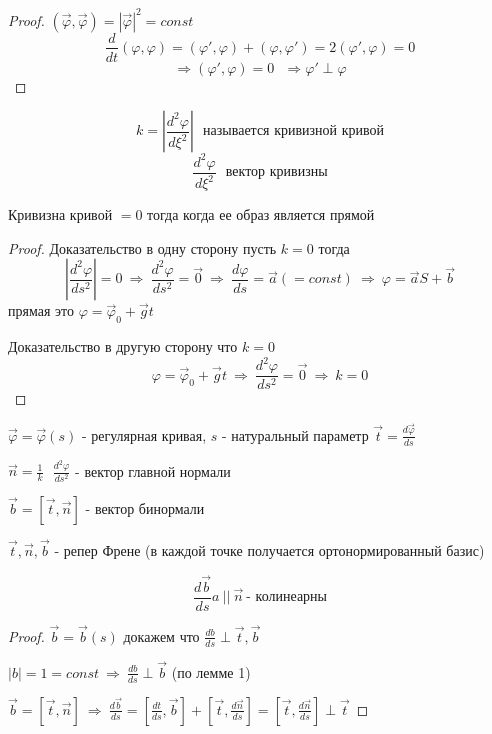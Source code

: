 \begin{proof}
  $(\vec \varphi, \vec \varphi) = |\vec \varphi|^2 = const$
  $$
  \frac{d}{dt}(\varphi, \varphi) = (\varphi', \varphi) +
  (\varphi, \varphi') = 2(\varphi', \varphi) = 0
  $$
  $$
  \Rightarrow (\varphi', \varphi) = 0 ~~~ \Rightarrow \varphi' \perp \varphi
  $$
\end{proof}

\begin{define}
  $$
  k =
  \left|
    \frac{d^2 \varphi}{d \xi^2}
  \right| ~~~
  \text{называется кривизной кривой}
  $$
  $$
    \frac{d^2 \varphi}{d \xi^2} ~~~ \text{вектор кривизны}
  $$
\end{define}

\begin{theorem}
  Кривизна кривой $= 0$ тогда когда ее образ является прямой
\end{theorem}

\begin{proof}
  Доказательство в одну сторону пусть $k = 0$ тогда
  $$
  \left| \frac{d^2 \varphi}{ds^2} \right| = 0 ~ \Rightarrow ~
  \frac{d^2 \varphi}{ds^2} = \vec 0 ~ \Rightarrow ~
  \frac{d\varphi}{d s} = \vec a (=const) ~ \Rightarrow ~
  \varphi = \vec a S + \vec b
  $$
  прямая это $\varphi = \vec \varphi_0 + \vec g t$

  Доказательство в другую сторону что $k = 0$
  $$
  \varphi = \vec \varphi_0 + \vec g t ~ \Rightarrow ~
  \frac{d^2 \varphi}{ds^2} = \vec 0 ~ \Rightarrow ~ k = 0
  $$
\end{proof}

$\vec \varphi = \vec \varphi (s)$ - регулярная кривая, $s$ - натуральный
параметр
$\vec t = \frac{d \vec \varphi}{ds}$

$\vec n = \frac{1}{k} ~~~ \frac{d^2 \varphi}{ds^2}$ - вектор главной нормали

$\vec b = [\vec t, \vec n]$ - вектор бинормали

$\vec t, \vec n, \vec b$ - репер Френе (в каждой точке получается
ортонормированный базис)

\begin{block}[Лемма 2]
  $$
  \frac{d\vec b}{ds}a~ || ~ \vec n ~ \text{- колинеарны}
  $$
\end{block}

\begin{proof}
  $\vec b = \vec b(s)$ докажем что $\frac{db}{ds} \perp \vec t, \vec b$

  $|b| = 1 = const ~ \Rightarrow ~ \frac{db}{ds} \perp \vec b$ (по лемме 1)

  $
  \vec b = [\vec t, \vec n] ~ \Rightarrow ~ \frac{d\vec b}{ds} =
  [\frac{dt}{ds}, \vec b] + [\vec t, \frac{d\vec n}{ds}] =
  [\vec t, \frac{d\vec n}{ds}] \perp \vec t
  $
\end{proof}

